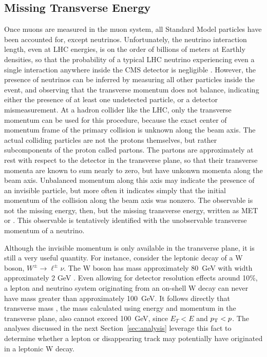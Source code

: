   \subsection{Missing Transverse Energy} \label{sec:MET}

  Once muons are measured in the muon system, all Standard Model particles have been accounted for, except neutrinos.
  Unfortunately, the neutrino interaction length, even at LHC energies, is on the order of billions of meters at Earthly densities, so that the probability of a typical LHC neutrino experiencing even a single interaction anywhere inside the CMS detector is negligible \cite{neutrinos}.
  However, the presence of neutrinos can be inferred by measuring all other particles inside the event, and observing that the transverse momentum does not balance, indicating either the presence of at least one undetected particle, or a detector mismeasurement.
  At a hadron collider like the LHC, only the transverse momentum can be used for this procedure, because the exact center of momentum frame of the primary collision is unknown along the beam axis.
  The actual colliding particles are not the protons themselves, but rather subcomponents of the proton called partons.
  The partons are approximately at rest with respect to the detector in the transverse plane, so that their transverse momenta are known to sum nearly to zero, but have unkonwn momenta along the beam axis.
  Unbalanced momentum along this axis may indicate the presence of an invisible particle, but more often it indicates simply that the initial momentum of the collision along the beam axis was nonzero.
  The observable is not the missing energy, then, but the missing transverse energy, written as MET or \met.
  This observable is tentatively identified with the unobservable transverse momentum of a neutrino.

  Although the invisible momentum is only available in the transverse plane, it is still a very useful quantity.
  For instance, consider the leptonic decay of a W boson, $W^{\pm}\rightarrow\ell^{\pm}\nu$.
  The W boson has mass approximately 80~GeV with width approximately 2 GeV \cite{pdg}.
  Even allowing for detector resolution effects around 10\%, a lepton and neutrino system originating from an on-shell W decay can never have mass greater than approximately 100~GeV.
  It follows directly that transverse mass \Mt, the mass calculated using energy and momentum in the transverse plane, also cannot exceed 100~GeV, since $E_T < E$ and $p_{\mathrm{T}} < p$.
  The analyses discussed in the next Section~\ref{sec:analysis} leverage this fact to determine whether a lepton or disappearing track may potentially have originated in a leptonic W decay.
  
